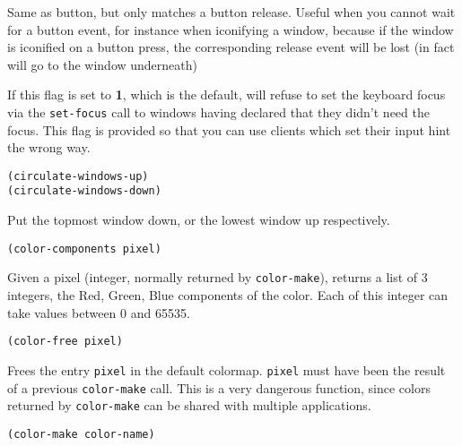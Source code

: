 Same as button, but only matches a button release. Useful when you cannot
wait for a button event, for instance when iconifying a window, because if
the window is iconified on a button press, the corresponding release event
will be lost (in fact will go to the window underneath)

        

If this flag is set to {\bf 1}, which is the default, {\GWM} will refuse to
set the keyboard focus via the \verb"set-focus" call to windows having
declared that they didn't need the focus. This flag is provided so that you
can use clients which set their input hint the wrong way.

        
{\usagefont\begin{verbatim}
(circulate-windows-up)
(circulate-windows-down)
\end{verbatim}}\usageupspace

Put the topmost window down, or the lowest window up respectively.

        
{\usagefont\begin{verbatim}
(color-components pixel)
\end{verbatim}}\usageupspace

Given a pixel (integer, normally returned by \verb|color-make|), returns a
list of 3 integers, the Red, Green, Blue components of the color. Each of this
integer can take values between 0 and 65535.

        
{\usagefont\begin{verbatim}
(color-free pixel)
\end{verbatim}}\usageupspace

Frees the entry \verb|pixel| in the default colormap. \verb|pixel| must have
been the result of a previous \verb|color-make| call. This is a very dangerous
function, since colors returned by \verb|color-make| can be shared with
multiple applications.

        
{\usagefont\begin{verbatim}
(color-make color-name)
\end{verbatim}}\usageupspace

